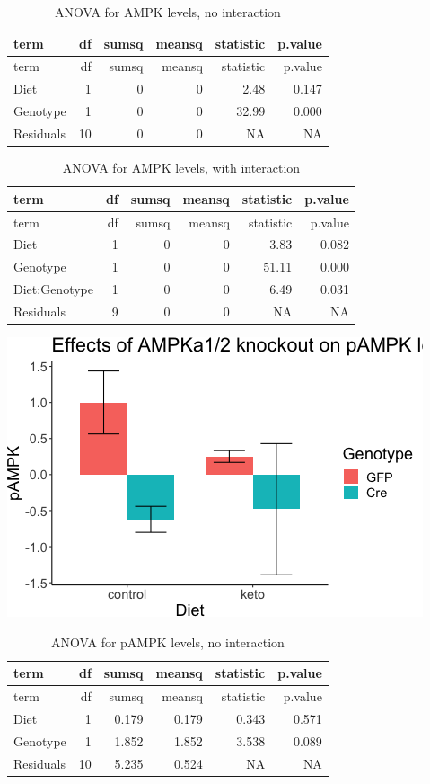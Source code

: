 \documentclass[]{article}
\begin{document}
\begin{longtable}[]{@{}lrrrrr@{}}
\caption{ANOVA for AMPK levels, no interaction}\tabularnewline
\toprule
term & df & sumsq & meansq & statistic & p.value\tabularnewline
\midrule
\endfirsthead
\toprule
term & df & sumsq & meansq & statistic & p.value\tabularnewline
\midrule
\endhead
Diet & 1 & 0 & 0 & 2.48 & 0.147\tabularnewline
Genotype & 1 & 0 & 0 & 32.99 & 0.000\tabularnewline
Residuals & 10 & 0 & 0 & NA & NA\tabularnewline
\bottomrule
\end{longtable}

\begin{longtable}[]{@{}lrrrrr@{}}
\caption{ANOVA for AMPK levels, with interaction}\tabularnewline
\toprule
term & df & sumsq & meansq & statistic & p.value\tabularnewline
\midrule
\endfirsthead
\toprule
term & df & sumsq & meansq & statistic & p.value\tabularnewline
\midrule
\endhead
Diet & 1 & 0 & 0 & 3.83 & 0.082\tabularnewline
Genotype & 1 & 0 & 0 & 51.11 & 0.000\tabularnewline
Diet:Genotype & 1 & 0 & 0 & 6.49 & 0.031\tabularnewline
Residuals & 9 & 0 & 0 & NA & NA\tabularnewline
\bottomrule
\end{longtable}

\includegraphics{figures/pAMPK-barplot-1.png}

\begin{longtable}[]{@{}lrrrrr@{}}
\caption{ANOVA for pAMPK levels, no interaction}\tabularnewline
\toprule
term & df & sumsq & meansq & statistic & p.value\tabularnewline
\midrule
\endfirsthead
\toprule
term & df & sumsq & meansq & statistic & p.value\tabularnewline
\midrule
\endhead
Diet & 1 & 0.179 & 0.179 & 0.343 & 0.571\tabularnewline
Genotype & 1 & 1.852 & 1.852 & 3.538 & 0.089\tabularnewline
Residuals & 10 & 5.235 & 0.524 & NA & NA\tabularnewline
\bottomrule
\end{longtable}
\end{document}
